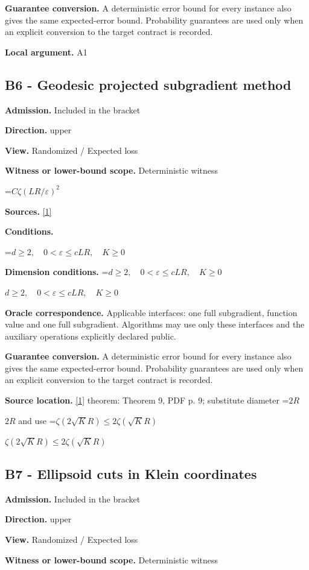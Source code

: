 \documentclass[10pt,a4paper]{article}
\newcommand{\AtlasMath}[1]{\par\begingroup\centering\setbox0=\hbox{$\displaystyle #1$}\ifdim\wd0>1.4\linewidth\typeout{ATLAS WIDE FORMULA: \the\wd0}\fi\ifdim\wd0>\linewidth\resizebox{\linewidth}{!}{\box0}\else\box0\fi\par\endgroup}
\newcommand{\AtlasInlineMath}[1]{\begingroup\setbox0=\hbox{$#1$}\ifdim\wd0>.4\linewidth\endgroup\AtlasMath{#1}\else\endgroup$#1$\fi}
\begin{document}
\textbf{Guarantee conversion.} A deterministic error bound for every instance also gives the same expected-error bound. Probability guarantees are used only when an explicit conversion to the target contract is recorded.

\textbf{Local argument.} A1

\subsection{B6 - Geodesic projected subgradient method}
\textbf{Admission.} Included in the bracket

\textbf{Direction.} upper

\textbf{View.} Randomized / Expected loss

\textbf{Witness or lower-bound scope.} Deterministic witness

\AtlasMath{C\zeta(LR/\varepsilon)^2}
\textbf{Sources.} \href{https://proceedings.mlr.press/v49/zhang16b.pdf}{[1]}

\textbf{Conditions.} 
\AtlasMath{d\ge2,\quad0<\varepsilon\le cLR,\quad K\ge0}


\textbf{Dimension conditions.} \AtlasInlineMath{d\ge2,\quad0<\varepsilon\le cLR,\quad K\ge0}

\textbf{Oracle correspondence.} Applicable interfaces: one full subgradient, function value and one full subgradient. Algorithms may use only these interfaces and the auxiliary operations explicitly declared public.

\textbf{Guarantee conversion.} A deterministic error bound for every instance also gives the same expected-error bound. Probability guarantees are used only when an explicit conversion to the target contract is recorded.

\textbf{Source location.} \href{https://proceedings.mlr.press/v49/zhang16b.pdf}{[1]} theorem: Theorem 9, PDF p. 9; substitute diameter \AtlasInlineMath{2R} and use \AtlasInlineMath{\zeta(2\sqrt K R)\le2\zeta(\sqrt K R)}

\subsection{B7 - Ellipsoid cuts in Klein coordinates}
\textbf{Admission.} Included in the bracket

\textbf{Direction.} upper

\textbf{View.} Randomized / Expected loss

\textbf{Witness or lower-bound scope.} Deterministic witness
\end{document}
